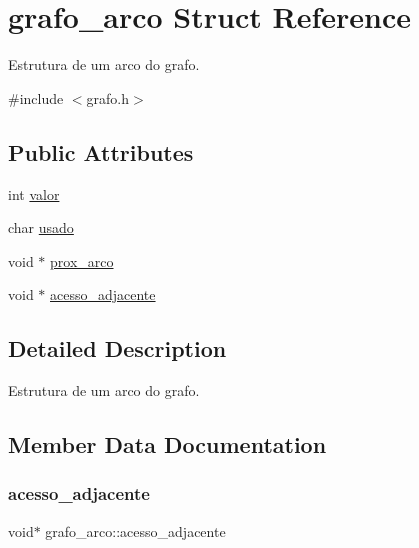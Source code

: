 \hypertarget{structgrafo__arco}{}\section{grafo\+\_\+arco Struct Reference}
\label{structgrafo__arco}


Estrutura de um arco do grafo.  




{\ttfamily \#include $<$grafo.\+h$>$}

\subsection*{Public Attributes}
\begin{DoxyCompactItemize}
\item 
int \hyperlink{structgrafo__arco_ac44260a9f2cf1f9e916e4590e1063c66}{valor}
\item 
char \hyperlink{structgrafo__arco_ad9879f942e7387bb04a0684c58f6e746}{usado}
\item 
void $\ast$ \hyperlink{structgrafo__arco_ae310647ce6396ecce8e8da3d0d5f35ef}{prox\+\_\+arco}
\item 
void $\ast$ \hyperlink{structgrafo__arco_a0c6153ae5e6ef6e159e4217881a8eac7}{acesso\+\_\+adjacente}
\end{DoxyCompactItemize}


\subsection{Detailed Description}
Estrutura de um arco do grafo. 

\subsection{Member Data Documentation}
\mbox{\label{structgrafo__arco_a0c6153ae5e6ef6e159e4217881a8eac7}} 
\subsubsection{\texorpdfstring{acesso\+\_\+adjacente}{acesso\_adjacente}}
{\footnotesize\ttfamily void$\ast$ grafo\+\_\+arco\+::acesso\+\_\+adjacente}

\mbox{\label{structgrafo__arco_ae310647ce6396ecce8e8da3d0d5f35ef}} 
